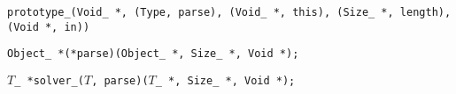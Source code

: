 
\tt{prototype_(Void_ *, (Type, parse), (Void_ *, this), (Size_ *, length), (Void *, in))}


\tt{Object_ *(*parse)(Object_ *, Size_ *, Void *);}


$T$\tt{_ *solver_(}$T$\tt{, parse)(}$T$\tt{_ *, Size_ *, Void *);}
